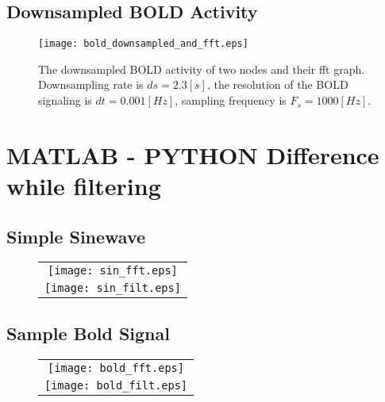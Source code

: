 \documentclass[12pt]{article}
\begin{document}
\subsection{Downsampled BOLD Activity}

\begin{figure}[htp!]
  \centering
  \texttt{[image: bold\_downsampled\_and\_fft.eps]}   


	\label{figur}\caption{The downsampled BOLD activity of two nodes and their fft graph. Downsampling rate is $ds=2.3[s]$, the resolution of the BOLD signaling is $dt=0.001[Hz]$, sampling frequency is $F_s=1000[Hz]$. }
	
\end{figure}

\newpage

\section{MATLAB - PYTHON Difference while filtering}

\subsection{Simple Sinewave}

\begin{figure}[htp!]
  \centering
    \begin{tabular}{c}
  \texttt{[image: sin\_fft.eps]} \\   
  \texttt{[image: sin\_filt.eps]}\\ 


	\end{tabular}	
	\label{figur}\caption{}
	
\end{figure}

\newpage


\subsection{Sample Bold Signal}

\begin{figure}[htp!]
  \centering
    \begin{tabular}{c}
  \texttt{[image: bold\_fft.eps]} \\   
  \texttt{[image: bold\_filt.eps]}\\ 


	\end{tabular}	
	\label{figur}\caption{}
	
\end{figure}
\end{document}
